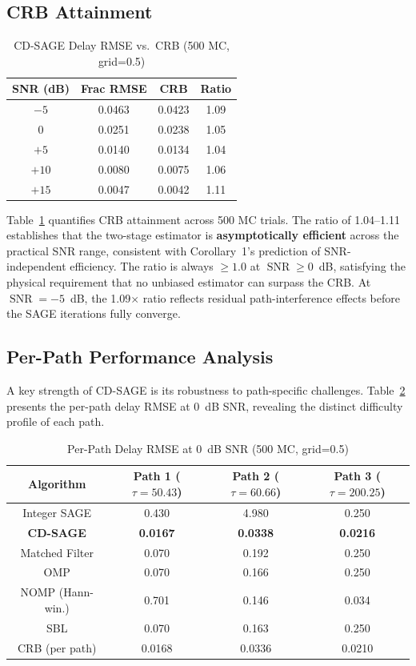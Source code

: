 \documentclass[a4paper,fleqn]{cas-dc}
\DeclareMathOperator{\SNR}{SNR}
\begin{document}
\subsection{CRB Attainment}

\begin{table}[cols=4,pos=h]
\centering
\caption{CD-SAGE Delay RMSE vs.\ CRB (500 MC, grid=0.5)}
\label{tab:crb}
\small
\begin{tabular}{@{}cccc@{}}
\toprule
SNR (dB) & Frac RMSE & CRB & Ratio \\
\midrule
$-5$ & 0.0463 & 0.0423 & 1.09 \\
$0$  & 0.0251 & 0.0238 & 1.05 \\
$+5$ & 0.0140 & 0.0134 & 1.04 \\
$+10$& 0.0080 & 0.0075 & 1.06 \\
$+15$& 0.0047 & 0.0042 & 1.11 \\
\bottomrule
\end{tabular}
\end{table}

Table~\ref{tab:crb} quantifies CRB attainment across 500 MC trials. The ratio of 1.04--1.11 establishes that the two-stage estimator is \textbf{asymptotically efficient} across the practical SNR range, consistent with Corollary~1's prediction of SNR-independent efficiency. The ratio is always $\ge 1.0$ at $\SNR \ge 0$~dB, satisfying the physical requirement that no unbiased estimator can surpass the CRB. At $\SNR = -5$~dB, the 1.09$\times$ ratio reflects residual path-interference effects before the SAGE iterations fully converge.

\subsection{Per-Path Performance Analysis}

A key strength of CD-SAGE is its robustness to path-specific challenges. Table~\ref{tab:perpath} presents the per-path delay RMSE at 0~dB SNR, revealing the distinct difficulty profile of each path.

\begin{table}[cols=4,pos=h]
\centering
\caption{Per-Path Delay RMSE at 0~dB SNR (500 MC, grid=0.5)}
\label{tab:perpath}
\small
\begin{tabular}{@{}cccc@{}}
\toprule
Algorithm & Path 1 ($\tau{=}50.43$) & Path 2 ($\tau{=}60.66$) & Path 3 ($\tau{=}200.25$) \\
\midrule
Integer SAGE & 0.430 & 4.980 & 0.250 \\
\textbf{CD-SAGE} & \textbf{0.0167} & \textbf{0.0338} & \textbf{0.0216} \\
Matched Filter & 0.070 & 0.192 & 0.250 \\
OMP & 0.070 & 0.166 & 0.250 \\
NOMP (Hann-win.) & 0.701 & 0.146 & 0.034 \\
SBL & 0.070 & 0.163 & 0.250 \\
\midrule
CRB (per path) & 0.0168 & 0.0336 & 0.0210 \\
\bottomrule
\end{tabular}
\end{table}
\end{document}
